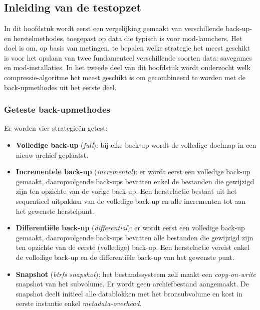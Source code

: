\chapter{}%
\label{ch:technischeanalyse}

\section{Inleiding van de testopzet}
\label{sec:inleiding-testopzet}

In dit hoofdstuk wordt eerst een vergelijking gemaakt van verschillende back-up- en herstelmethodes, toegepast op data die typisch is voor mod-launchers. Het doel is om, op basis van metingen, te bepalen welke strategie het meest geschikt is voor het opslaan van twee fundamenteel verschillende soorten data: savegames en mod-installaties. In het tweede deel van dit hoofdstuk wordt onderzocht welk compressie-algoritme het meest geschikt is om gecombineerd te worden met de back-upmethodes uit het eerste deel.

\subsection{Geteste back-upmethodes}

Er worden vier strategieën getest:

\begin{itemize}
    \item \textbf{Volledige back-up} (\textit{full}): bij elke back-up wordt de volledige doelmap in een nieuw archief geplaatst.
    \item \textbf{Incrementele back-up} (\textit{incremental}): er wordt eerst een volledige back-up gemaakt, daaropvolgende back-ups bevatten enkel de bestanden die gewijzigd zijn ten opzichte van de vorige back-up. Een herstelactie bestaat uit het sequentieel uitpakken van de volledige back-up en alle incrementen tot aan het gewenste herstelpunt.
    \item \textbf{Differentiële back-up} (\textit{differential}): er wordt eerst een volledige back-up gemaakt, daaropvolgende back-ups bevatten alle bestanden die gewijzigd zijn ten opzichte van de eerste (volledige) back-up. Een herstelactie vereist enkel de volledige back-up en de differentiële back-up van het gewenste punt.
    \item \textbf{Snapshot} (\textit{btrfs snapshot}): het bestandssysteem zelf maakt een \textit{copy-on-write} snapshot van het subvolume. Er wordt geen archiefbestand aangemaakt. De snapshot deelt initieel alle datablokken met het bronsubvolume en kost in eerste instantie enkel \textit{metadata-overhead}.
\end{itemize}

